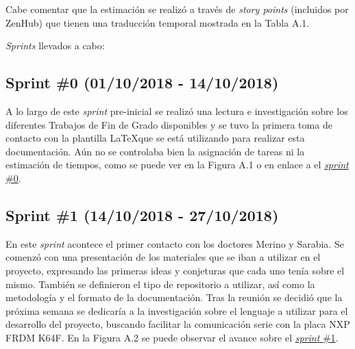Cabe comentar que la estimación se realizó a través de \textit{story points} (incluidos por ZenHub) que tienen una traducción temporal mostrada en la Tabla A.1.


\textit{Sprints} llevados a cabo:

\subsection{Sprint \#0 (01/10/2018 - 14/10/2018)}

A lo largo de este \textit{sprint} pre-inicial se realizó una lectura e investigación sobre los diferentes Trabajos de Fin de Grado disponibles  y se tuvo la primera toma de contacto con la plantilla \LaTeX que se está utilizando para realizar esta documentación. Aún no se controlaba bien la asignación de tareas ni la estimación de tiempos, como se puede ver en la Figura A.1 o en enlace a el \href{https://github.com/FranBurgos/TFG/milestone/1?closed=1}{\textit{sprint} \#0}.


\subsection{Sprint \#1 (14/10/2018 - 27/10/2018)}

En este \textit{sprint} acontece el primer contacto con los doctores Merino y Sarabia. Se comenzó con una presentación de los materiales que se iban a utilizar en el proyecto, expresando las primeras ideas y conjeturas que cada uno tenía sobre el mismo. También se definieron el tipo de repositorio a utilizar, así como la metodología y el formato de la documentación. Tras la reunión se decidió que la próxima semana se dedicaría a la investigación sobre el lenguaje a utilizar para el desarrollo del proyecto, buscando facilitar la comunicación serie con la placa NXP FRDM K64F. En la Figura A.2 se puede observar el avance sobre el \href{https://github.com/FranBurgos/TFG/milestone/2?closed=1}{\textit{sprint} \#1}.

